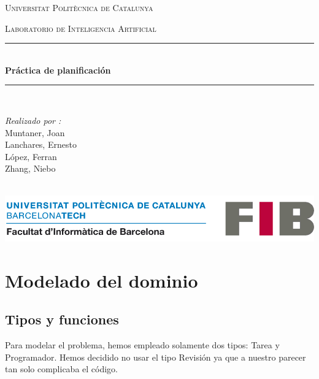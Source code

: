 \documentclass[12pt, titlepage]{article}
\begin{document}
\begin{titlepage}
    \centering
    \vspace{0.5 cm}
    \begin{center}
        \textsc{\Large Universitat Politècnica de Catalunya}\\[2.0 cm]
    \end{center}%
    \textsc{\Large Laboratorio de Inteligencia Artificial }\\[0.5 cm]
    \rule{\linewidth}{0.2 mm} \\[0.4 cm]
    { \huge \bfseries Práctica de planificación}\\
    \rule{\linewidth}{0.2 mm} \\[1.5 cm]
    
    \vfill

    \begin{minipage}{\textwidth}

        \begin{flushright} \large
            \emph{Realizado por :} \\
            Muntaner, Joan \\
            Lanchares, Ernesto \\
            López, Ferran \\
            Zhang, Niebo
        \end{flushright}

    \end{minipage}\\[2 cm]

    \includegraphics[scale = 0.3]{UPCLogo.png}
    \vspace{0.5cm}
\end{titlepage}

\tableofcontents

\section{Modelado del dominio}
\subsection{Tipos y funciones}

Para modelar el problema, hemos empleado solamente dos tipos: Tarea y
Programador. Hemos decidido no usar el tipo Revisión ya que a
nuestro parecer tan solo complicaba el código.
\end{document}
